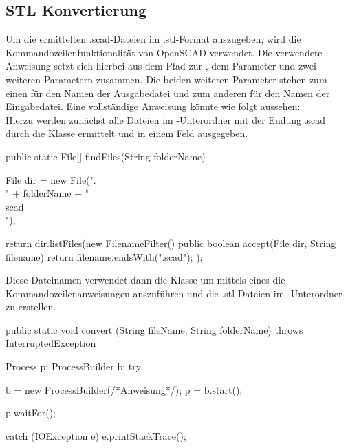 \subsection{STL Konvertierung}
Um die ermittelten .scad-Dateien im .stl-Format auszugeben, wird die Kommandozeilenfunktionalität von OpenSCAD verwendet.
Die verwendete Anweisung setzt sich hierbei aus dem Pfad zur , dem Parameter  und zwei weiteren Parametern zusammen. 
Die beiden weiteren Parameter stehen zum einen für den Namen der Ausgabedatei und zum anderen für den Namen der Eingabedatei.
Eine vollständige Anweisung könnte wie folgt aussehen:  \\
Hierzu werden zunächst alle Dateien im -Unterordner mit der Endung .scad durch die Klasse  ermittelt und in einem Feld ausgegeben.

\begin{code}
	public static File[] findFiles(String folderName){
		File dir = new File(".\\" + folderName + "\\scad\\");
		
		return dir.listFiles(new FilenameFilter() { 
			public boolean accept(File dir, String filename)
			{ return filename.endsWith(".scad"); }
		});
	}
\end{code}

Diese Dateinamen verwendet dann die Klasse  um mittels eines  die Kommandozeilenanweisungen auszuführen und die .stl-Dateien im -Unterordner zu erstellen.

\begin{code}
	public static void convert (String fileName, String folderName) throws InterruptedException {
		Process p;
		ProcessBuilder b;
		try {
			b = new ProcessBuilder(/*Anweisung*/);
			p = b.start();
						
			p.waitFor();
		} catch (IOException e) {
			e.printStackTrace();
		}
	}
\end{code}